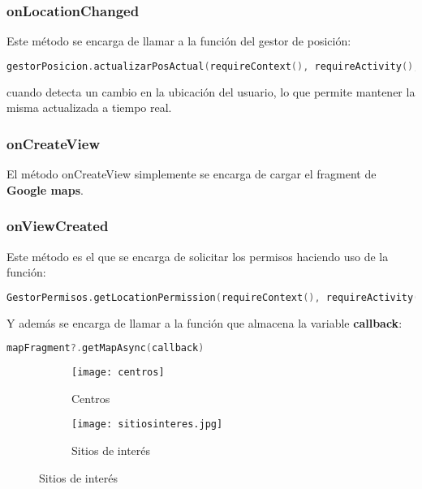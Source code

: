 \subsubsection{onLocationChanged}
Este método se encarga de llamar a la función del gestor de posición:

\begin{lstlisting}[language=Kotlin]
gestorPosicion.actualizarPosActual(requireContext(), requireActivity(), it)
\end{lstlisting}

cuando detecta un cambio en la ubicación del usuario, lo que permite mantener la misma actualizada a tiempo real.

\subsubsection{onCreateView}
El método onCreateView simplemente se encarga de cargar el fragment de \textbf{Google maps}.

\subsubsection{onViewCreated}
Este método es el que se encarga de solicitar los permisos haciendo uso de la función:

\begin{lstlisting}[language=Kotlin]
GestorPermisos.getLocationPermission(requireContext(), requireActivity())]
\end{lstlisting}

Y además se encarga de llamar a la función que almacena la variable \textbf{callback}:

\begin{lstlisting}[language=Kotlin]
mapFragment?.getMapAsync(callback)
\end{lstlisting}

\begin{figure}[H]
\begin{subfigure}{0.5\textwidth}
  \centering
  \texttt{[image: centros]}
  \caption{Centros}
  \label{fig:sub-first}
\end{subfigure}
\begin{subfigure}{0.5\textwidth}
  \centering
  \texttt{[image: sitiosinteres.jpg]}
  \caption{Sitios de interés}
  \label{fig:sub-second}
\end{subfigure}
\end{figure}

